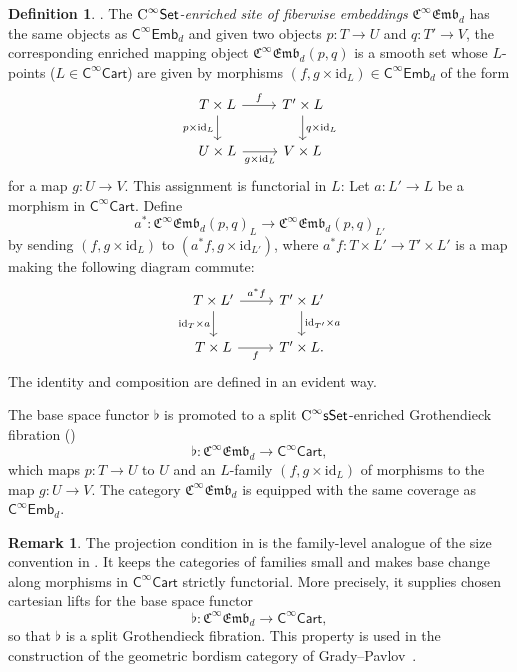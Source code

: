 \documentclass{amsart}
\newcommand{\cat}[1]{\mathsf{#1}}
\newcommand{\Set}{\cat{Set}}
\newcommand{\sset}{\cat{sSet}}
\newcommand{\id}{\mathrm{id}}
\newcommand{\CSet}{\textnormal{C}^{\infty}\Set}
\newcommand{\CsSet}{\textnormal{C}^{\infty}\sset}
\newcommand{\Cart}{\cat{C}^{\infty}\cat{Cart}}
\newcommand{\fembnoniso}[1]{\cat{C}^{\infty}\cat{Emb}_{#1}}
\newcommand{\femb}[1]{\mathfrak{C}^{\infty}\mathfrak{Emb}_{#1}}
\newcommand{\ra}{\rightarrow}
\theoremstyle{definition}
\newtheorem{definition}[equation]{Definition}
\newtheorem{remark}[equation]{Remark}
\numberwithin{equation}{subsection}
\numberwithin{subsubsection}{subsection}
\begin{document}
\begin{definition}\label{def:femb}
  \textnormal{\cite[Definition~4.2.13]{GP26}}.
  The \emph{\(\CSet\)-enriched site of fiberwise
  embeddings} \(\femb{d}\) has the same
  objects as \(\fembnoniso{d}\) and given two objects \(p:T\ra U\)
  and \(q:T'\ra
  V\), the corresponding enriched mapping object \(\femb{d}(p, q)\)
  is a smooth
  set whose \(L\)-points (\(L\in \Cart\)) are given by morphisms
  \((f,g\times\id_{L})\in \fembnoniso{d}\) of
  the form
  \[
    \begin{tikzcd}
      T\times L \arrow[r,"f"] \arrow[d,"p\times
      \id_{L}"'] & T'\times
      L \arrow[d,"q\times \id_{L}"] \\
      U\times L \arrow[r,"g\times \id_{L}"'] & V\times L
    \end{tikzcd}
  \]
  for a map \(g: U \ra V\). This assignment is functorial in \(L\):
  Let \(a:L'\to L\) be a
  morphism in \(\Cart\). Define
  \[
    a^\ast:\femb{d}(p,q)_L\longrightarrow \femb{d}(p,q)_{L'}
  \]
  by sending \((f,g\times \id_L)\) to \((a^\ast f, g\times \id_{L'})\), where
  \(a^\ast f:T\times L'\to T'\times L'\) is a map making the following diagram
  commute:
  \[
    \begin{tikzcd}
      T\times L' \arrow[r,"a^\ast f"] \arrow[d,"\id_T\times a"'] &
      T'\times L' \arrow[d,"\id_{T'}\times a"] \\
      T\times L \arrow[r,"f"'] &
      T'\times L .
    \end{tikzcd}
  \]
  The identity and composition are defined in an evident way.

  The base space functor \(\flat\) is promoted to a split \(\CsSet\)-enriched
  Grothendieck fibration
  (\cite[Definition~4.2.4]{GP26})
  \[
    \flat: \femb{d}\ra \Cart,
  \]
  which maps \(p:T\ra U\) to \(U\) and an \(L\)-family \((f,
  g\times\id_{L})\) of
  morphisms to the map \(g: U \ra V\). The category \(\femb{d}\) is
  equipped with
  the same coverage as \(\fembnoniso{d}\).
\end{definition}

\begin{remark}\label{rem:base.space.functor}
  The projection condition in
   is the family-level analogue of the
  size convention in . It keeps the
  categories of families small and makes base change along morphisms
  in \(\Cart\) strictly functorial. More precisely, it supplies chosen
  cartesian lifts for the base space functor
  \[
    \flat:\femb{d}\longrightarrow\Cart,
  \]
  so that \(\flat\) is a split Grothendieck fibration. This property is used in
  the construction of the geometric bordism
  category of Grady--Pavlov~\cite{GP26}.
\end{remark}
\end{document}
